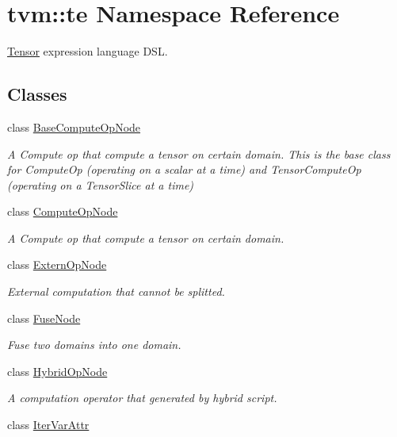 \hypertarget{namespacetvm_1_1te}{}\section{tvm\+:\+:te Namespace Reference}
\label{namespacetvm_1_1te}


\hyperlink{classtvm_1_1te_1_1Tensor}{Tensor} expression language D\+SL.  


\subsection*{Classes}
\begin{DoxyCompactItemize}
\item 
class \hyperlink{classtvm_1_1te_1_1BaseComputeOpNode}{Base\+Compute\+Op\+Node}
\begin{DoxyCompactList}\small\item\em A Compute op that compute a tensor on certain domain. This is the base class for Compute\+Op (operating on a scalar at a time) and Tensor\+Compute\+Op (operating on a Tensor\+Slice at a time) \end{DoxyCompactList}\item 
class \hyperlink{classtvm_1_1te_1_1ComputeOpNode}{Compute\+Op\+Node}
\begin{DoxyCompactList}\small\item\em A Compute op that compute a tensor on certain domain. \end{DoxyCompactList}\item 
class \hyperlink{classtvm_1_1te_1_1ExternOpNode}{Extern\+Op\+Node}
\begin{DoxyCompactList}\small\item\em External computation that cannot be splitted. \end{DoxyCompactList}\item 
class \hyperlink{classtvm_1_1te_1_1FuseNode}{Fuse\+Node}
\begin{DoxyCompactList}\small\item\em Fuse two domains into one domain. \end{DoxyCompactList}\item 
class \hyperlink{classtvm_1_1te_1_1HybridOpNode}{Hybrid\+Op\+Node}
\begin{DoxyCompactList}\small\item\em A computation operator that generated by hybrid script. \end{DoxyCompactList}\item 
class \hyperlink{classtvm_1_1te_1_1IterVarAttr}{Iter\+Var\+Attr}

\end{DoxyCompactItemize}
